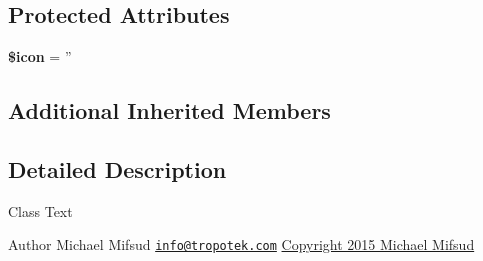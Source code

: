 \subsection*{Protected Attributes}
\begin{DoxyCompactItemize}
\item 
\hypertarget{classTk_1_1Form_1_1Field_1_1Button_a419d000ffa9212a2ab3a6dd54b9015b7}{{\bfseries \$icon} = ''}\label{classTk_1_1Form_1_1Field_1_1Button_a419d000ffa9212a2ab3a6dd54b9015b7}

\end{DoxyCompactItemize}
\subsection*{Additional Inherited Members}


\subsection{Detailed Description}
Class Text

\begin{DoxyAuthor}{Author}
Michael Mifsud \href{mailto:info@tropotek.com}{\tt info@tropotek.\+com} \hyperlink{}{Copyright 2015 Michael Mifsud }
\end{DoxyAuthor}


